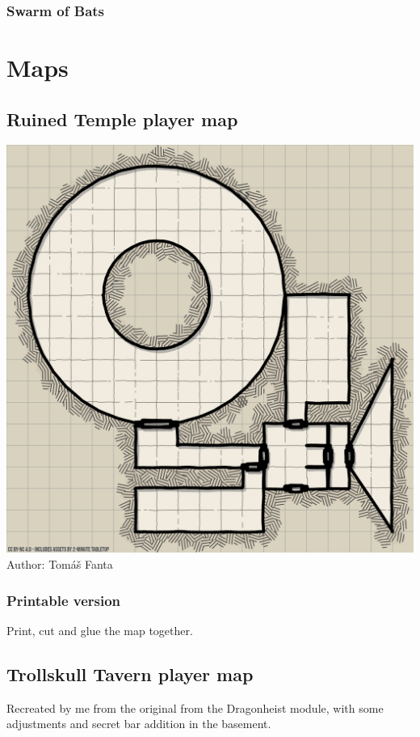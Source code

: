\documentclass[10pt,onecolumn,twoside,openany,bg=full,layout=true]{dndbook}
\begin{document}
\subsection{Swarm of Bats}\label{subsec:swarm-of-bats}
\lipsum[1]

\vfill
\newpage

\chapter{Maps}\label{ch:maps}
\section{Ruined Temple player map}\label{sec:ruined-temple}
\includegraphics[width=1\textwidth]{img/maps/ruined_temple_map_19x19}
Author: Tomáš Fanta

\subsection* {Printable version}
Print, cut and glue the map together.


\vfill
\newpage
\section{Trollskull Tavern player map}\label{sec:trollskull-tavern-player-map}
Recreated by me from the original from the Dragonheist module, with some adjustments and secret bar addition in the basement.
\end{document}
